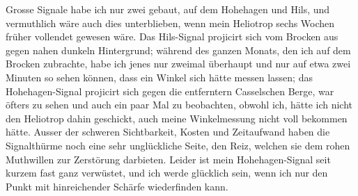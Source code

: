 \par\noindent\hspace*{\parindent}Grosse Signale habe ich nur zwei gebaut, auf dem Hohehagen und Hils, und vermuthlich wäre auch dies unterblieben, wenn mein Heliotrop sechs Wochen früher vollendet gewesen wäre.
Das Hils-Signal projicirt sich vom Brocken aus gegen nahen dunkeln Hintergrund; während des ganzen Monats, den ich auf dem Brocken zubrachte, habe ich jenes nur zweimal überhaupt  und nur auf etwa zwei Minuten so sehen können, dass ein Winkel sich hätte messen lassen; das Hohehagen-Signal projicirt sich gegen die entferntern Casselschen Berge, war öfters zu sehen und auch ein paar Mal zu beobachten, obwohl ich, hätte ich nicht den Heliotrop dahin geschickt, auch meine Winkelmessung nicht voll bekommen hätte.
Ausser der schweren Sichtbarkeit, Kosten und Zeitaufwand haben die Signalthürme noch eine sehr unglückliche Seite, den Reiz, welchen sie dem rohen Muthwillen zur Zerstörung darbieten.
Leider ist mein Hohehagen-Signal seit kurzem fast ganz verwüstet, und ich werde glücklich sein, wenn ich nur den Punkt mit hinreichender Schärfe wiederfinden kann.

